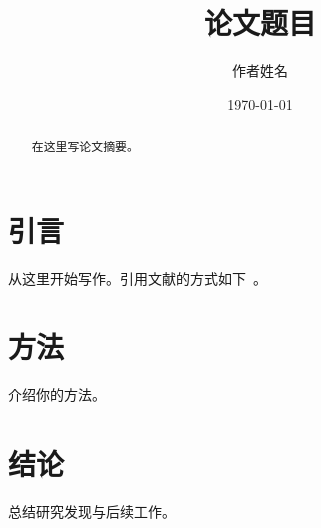 \documentclass[UTF8,a4paper,zihao=-4]{ctexart}
\title{论文题目}
\author{作者姓名}
\date{\today}
\begin{document}
\maketitle

\begin{abstract}
在这里写论文摘要。
\end{abstract}

\section{引言}
从这里开始写作。引用文献的方式如下~\cite{knuth1984}。

\section{方法}
介绍你的方法。

\section{结论}
总结研究发现与后续工作。



\end{document}
